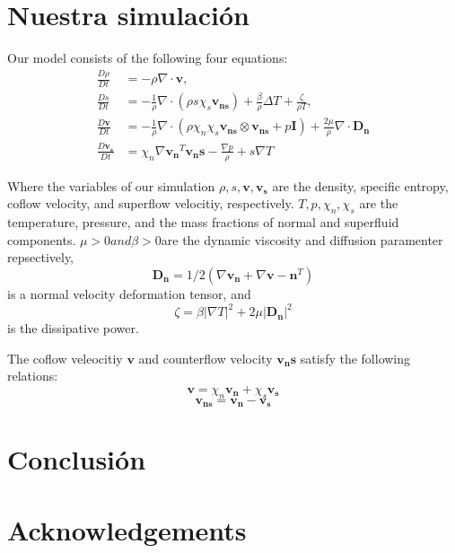 \documentclass{article}
\begin{document}
\section{Nuestra simulación}
Our model consists of the following four equations:
\begin{align}
\frac{D\rho}{Dt} &= -\rho \nabla \cdot \mathbf{v}, \\
\frac{Ds}{Dt} &= -\frac{1}{\rho} \nabla \cdot (\rho s \chi_s \mathbf{v_{ns}}) + \frac{\beta}{\rho} \Delta T + \frac{\zeta}{\rho T} ,\\
\frac{D\mathbf{v}}{Dt} &= -\frac{1}{\rho} \nabla \cdot (\rho \chi_n \chi_s \mathbf{v_{ns}} \otimes \mathbf{v_{ns}} + p \mathbf{I}) + \frac{2 \mu}{\rho} \nabla \cdot \mathbf{D_n} \\
\frac{D\mathbf{v_s}}{Dt} &= \chi_n \nabla \mathbf{v_n}^T \mathbf{v_ns} - \frac{\nabla p}{\rho} + s \nabla T
\end{align}

Where the variables of our simulation  \(\rho, s, \mathbf{v}, \mathbf{v_s}\) are the density, specific entropy, coflow velocity, and superflow velocitiy, respectively.
\(T, p, \chi_n, \chi_s\) are the temperature, pressure, and the mass fractions of normal and superfluid components. 
\(\mu > 0 and \beta>0 \)are the dynamic viscosity and diffusion paramenter repsectively, 
\[\mathbf{D_n} = 1/2(\nabla \mathbf{v_n} +  \nabla \mathbf{v-n}^T)\] 
is a normal velocity deformation tensor, and
\[\zeta = \beta |\nabla T|^2 + 2 \mu |\mathbf{D_n}|^2\]
is the dissipative power.


The coflow veleocitiy \(\mathbf{v}\) and counterflow velocity \( \mathbf{v_ns}\) satisfy the following relations:
\[\mathbf{v} = \chi_n \mathbf{v_n} + \chi_s \mathbf{v_s}\]
\[\mathbf{v_{ns}}  = \mathbf{v_n} - \mathbf{v_s}\]

\section{Conclusión}


 
\section{Acknowledgements}


\

\end{document}
